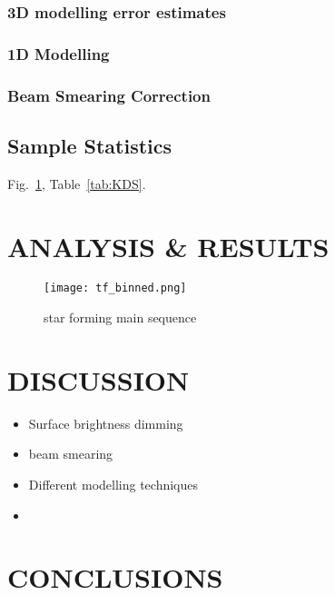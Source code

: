 \documentclass[a4paper,fleqn,usenatbib]{mn2e}
\begin{document}
\subsubsection{3D modelling error estimates}\label{subsubsec:model_errors}


\subsubsection{1D Modelling}\label{subsubsec:1d modelling}
\subsubsection{Beam Smearing Correction}\label{subsubsec:beam smearing corr}




  




\subsection{Sample Statistics}



Fig.~\ref{fig:distributions}, Table~\ref{tab:KDS}.



\section{ANALYSIS \& RESULTS}\label{sec:results}

\begin{figure}
\centering
\texttt{[image: tf\_binned.png]}
\caption{star forming main sequence}
\label{fig:distributions}
\end{figure}


\section{DISCUSSION}\label{sec:discussion}

\begin{itemize}
    \item Surface brightness dimming
    \item beam smearing
    \item Different modelling techniques
    \item 
\end{itemize}

\section{CONCLUSIONS}\label{sec:conclusions}
\end{document}

